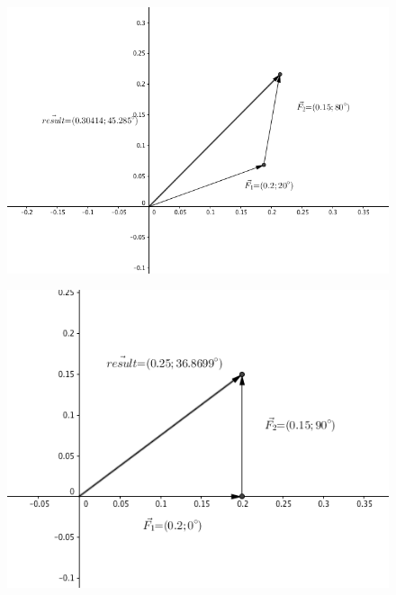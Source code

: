 \documentclass[11pt, titlepage]{article}
\begin{document}
\begin{figure}[p]
\centering
\hspace*{-10.5cm}
\includegraphics[scale=0.15, angle=0]{vector2.jpg}
\vspace*{19cm}
\end{figure}

\begin{figure}[p]
\centering
\hspace*{-10.5cm}
\includegraphics[scale=0.15, angle=0]{vector3.jpg}
\vspace*{19cm}
\end{figure}
\end{document}
